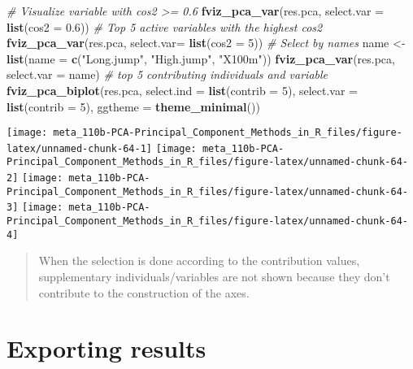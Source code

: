 \documentclass[]{book}
\newenvironment{Shaded}{\begin{snugshade}}{\end{snugshade}}
\newcommand{\CommentTok}[1]{\textcolor[rgb]{0.56,0.35,0.01}{\textit{#1}}}
\newcommand{\DataTypeTok}[1]{\textcolor[rgb]{0.13,0.29,0.53}{#1}}
\newcommand{\DecValTok}[1]{\textcolor[rgb]{0.00,0.00,0.81}{#1}}
\newcommand{\FloatTok}[1]{\textcolor[rgb]{0.00,0.00,0.81}{#1}}
\newcommand{\KeywordTok}[1]{\textcolor[rgb]{0.13,0.29,0.53}{\textbf{#1}}}
\newcommand{\NormalTok}[1]{#1}
\newcommand{\StringTok}[1]{\textcolor[rgb]{0.31,0.60,0.02}{#1}}
\begin{document}
\begin{Shaded}
\begin{Highlighting}[]
\CommentTok{# Visualize variable with cos2 >= 0.6}
\KeywordTok{fviz_pca_var}\NormalTok{(res.pca, }\DataTypeTok{select.var =} \KeywordTok{list}\NormalTok{(}\DataTypeTok{cos2 =} \FloatTok{0.6}\NormalTok{))}
\CommentTok{# Top 5 active variables with the highest cos2}
\KeywordTok{fviz_pca_var}\NormalTok{(res.pca, }\DataTypeTok{select.var=} \KeywordTok{list}\NormalTok{(}\DataTypeTok{cos2 =} \DecValTok{5}\NormalTok{))}
\CommentTok{# Select by names}
\NormalTok{name <-}\StringTok{ }\KeywordTok{list}\NormalTok{(}\DataTypeTok{name =} \KeywordTok{c}\NormalTok{(}\StringTok{"Long.jump"}\NormalTok{, }\StringTok{"High.jump"}\NormalTok{, }\StringTok{"X100m"}\NormalTok{))}
\KeywordTok{fviz_pca_var}\NormalTok{(res.pca, }\DataTypeTok{select.var =}\NormalTok{ name)}
\CommentTok{# top 5 contributing individuals and variable}
\KeywordTok{fviz_pca_biplot}\NormalTok{(res.pca, }\DataTypeTok{select.ind =} \KeywordTok{list}\NormalTok{(}\DataTypeTok{contrib =} \DecValTok{5}\NormalTok{), }
               \DataTypeTok{select.var =} \KeywordTok{list}\NormalTok{(}\DataTypeTok{contrib =} \DecValTok{5}\NormalTok{),}
               \DataTypeTok{ggtheme =} \KeywordTok{theme_minimal}\NormalTok{())}
\end{Highlighting}
\end{Shaded}

\begin{center}\texttt{[image: meta\_110b-PCA-Principal\_Component\_Methods\_in\_R\_files/figure-latex/unnamed-chunk-64-1]} \texttt{[image: meta\_110b-PCA-Principal\_Component\_Methods\_in\_R\_files/figure-latex/unnamed-chunk-64-2]} \texttt{[image: meta\_110b-PCA-Principal\_Component\_Methods\_in\_R\_files/figure-latex/unnamed-chunk-64-3]} \texttt{[image: meta\_110b-PCA-Principal\_Component\_Methods\_in\_R\_files/figure-latex/unnamed-chunk-64-4]} \end{center}

\begin{quote}
When the selection is done according to the contribution values, supplementary individuals/variables are not shown because they don't contribute to the construction of the axes.
\end{quote}

\hypertarget{exporting-results}{%
\section{Exporting results}\label{exporting-results}}
\end{document}

